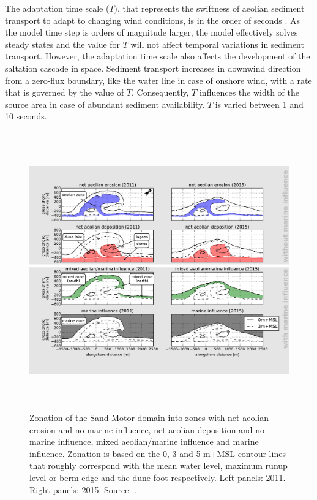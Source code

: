 The adaptation time scale ($T$), that represents the swiftness of
aeolian sediment transport to adapt to changing wind conditions, is in
the order of seconds \citep{DavidsonArnott2008, deVries2014a}. As the
model time step is orders of magnitude larger, the model effectively
solves steady states and the value for $T$ will not affect temporal
variations in sediment transport. However, the adaptation time scale
also affects the development of the saltation cascade in
space. Sediment transport increases in downwind direction from a
zero-flux boundary, like the water line in case of onshore wind, with
a rate that is governed by the value of $T$. Consequently, $T$
influences the width of the source area in case of abundant sediment
availability. $T$ is varied between 1 and 10 seconds.

\begin{figure}
  \centering
  \includegraphics[height=12cm, angle=90]{../Figures/decomposition}
  \caption{Zonation of the Sand Motor domain into zones with net
    aeolian erosion and no marine influence, net aeolian deposition
    and no marine influence, mixed aeolian/marine influence and marine
    influence. Zonation is based on the 0, 3 and 5 m+MSL contour lines
    that roughly correspond with the mean water level, maximum runup
    level or berm edge and the dune foot respectively. Left panels:
    2011. Right panels: 2015. Source: \citet{Hoonhout2017a}.}
  \label{fig:decomposition2}
\end{figure}

